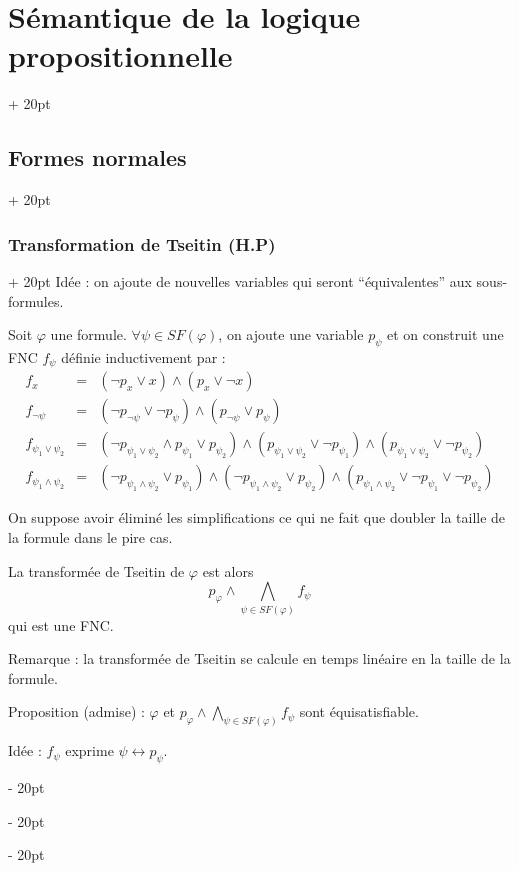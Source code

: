\documentclass[a4paper, 12pt, twoside]{article}
\newcommand{\ind}[1][20pt]{\advance\leftskip + #1}
\newcommand{\deind}[1][20pt]{\advance\leftskip - #1}
\newenvironment{indt}[2][20pt]{#2 \par \ind[#1]}{\par \deind} %
\begin{document}
\begin{indt}{\section{Sémantique de la logique propositionnelle}}
\begin{indt}{\subsection{Formes normales}}
            \vspace{12pt}
            
            \begin{indt}{\subsubsection{Transformation de Tseitin (H.P)}}
                Idée : on ajoute de nouvelles variables qui seront ``équivalentes'' aux sous-formules.
                
                Soit $\varphi$ une formule. $\forall \psi \in SF(\varphi)$, on ajoute une variable $p_\psi$ et on construit une FNC $f_\psi$ définie inductivement par :
                    \[
                        \begin{array}{lrl}
                            f_x &=& (\neg p_x \vee x) \wedge (p_x \vee \neg x)
                            \\
                            f_{\neg \psi} &=& (\neg p_{\neg \psi} \vee \neg p_\psi) \wedge (p_{\neg \psi} \vee p_\psi)
                            \\
                            f_{\psi_1 \vee \psi_2} &=& (\neg p_{\psi_1 \vee \psi_2} \wedge p_{\psi_1} \vee p_{\psi_2}) \wedge (p_{\psi_1 \vee \psi_2} \vee \neg p_{\psi_1}) \wedge (p_{\psi_1 \vee \psi_2} \vee \neg p_{\psi_2})
                            \\
                            f_{\psi_1 \wedge \psi_2} &=& (\neg p_{\psi_1 \wedge \psi_2} \vee p_{\psi_1}) \wedge (\neg p_{\psi_1 \wedge \psi_2} \vee p_{\psi_2}) \wedge (p_{\psi_1 \wedge \psi_2} \vee \neg p_{\psi_1} \vee \neg p_{\psi_2})
                        \end{array}
                    \]
                
                On suppose avoir éliminé les simplifications ce qui ne fait que doubler la taille de la formule dans le pire cas.
                
                \vspace{12pt}
                
                La transformée de Tseitin de $\varphi$ est alors
                    \[ p_\varphi \wedge \bigwedge_{\psi \in SF(\varphi)} f_\psi \]
                qui est une FNC.
                
                \vspace{12pt}
                
                Remarque : la transformée de Tseitin se calcule en temps linéaire en la taille de la formule.
                
                Proposition (admise) : $\varphi$ et $p_\varphi \wedge \displaystyle \bigwedge_{\psi \in SF(\varphi)} f_\psi$ sont équisatisfiable.
                
                Idée : $f_\psi$ exprime $\psi \leftrightarrow p_\psi$.
            \end{indt}
        \end{indt}
        
    \end{indt}
    
\end{document}
